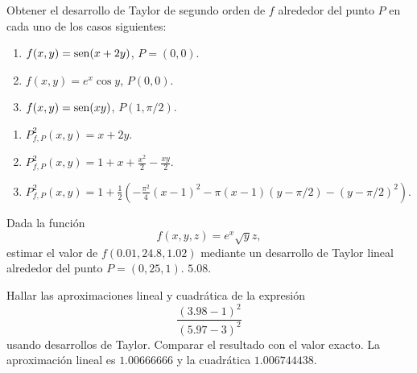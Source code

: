 {Obtener el desarrollo de Taylor de segundo orden de $f$ alrededor del punto $P$ en cada uno de los casos siguientes:
\begin{enumerate}
\item $f(x,y)=\operatorname{sen}(x+2y)$, $P=(0,0)$.
\item $f(x,y)=e^x\cos y$, $P(0,0)$.
\item $f(x,y)=\operatorname{sen}(xy)$, $P(1,\pi/2)$.
\end{enumerate}
}
{\begin{enumerate}
\item $P^2_{f,P}(x,y)= x+2y$.
\item $P^2_{f,P}(x,y)= 1+x+\frac{x^2}{2}-\frac{xy}{2}$.
\item $P^2_{f,P}(x,y)= 1+\frac{1}{2}\left(-\frac{\pi^2}{4}(x-1)^2-\pi(x-1)(y-\pi/2)-(y-\pi/2)^2\right)$.
\end{enumerate}
}
{
}


{Dada la función 
\[
f(x,y,z)=e^x\sqrt{y}z,
\]
estimar el valor de $f(0.01,24.8,1.02)$ mediante un desarrollo de Taylor lineal alrededor del punto $P=(0,25,1)$.
}
{$5.08$.
}
{
}


{Hallar las aproximaciones lineal y cuadrática de la expresión
\[
\frac{(3.98-1)^2}{(5.97-3)^2}
\]
usando desarrollos de Taylor. Comparar el resultado con el valor exacto.
}
{La aproximación lineal es $1.00666666$ y la cuadrática $1.006744438$.
}
{
}